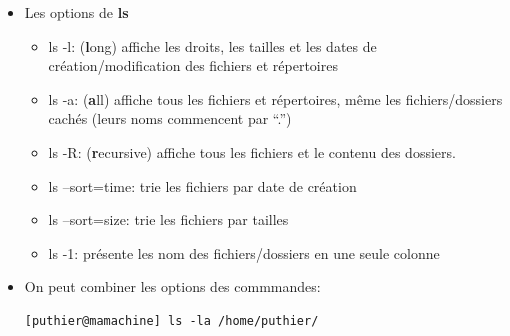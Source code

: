 \documentclass[10pt, xcolor=dvipsnames]{beamer}
\begin{document}
\begin{frame}[fragile]

        \begin{itemize}

            \item Les options de \textbf{ls}\\
			\begin{itemize}
             \item ls -l: (\textbf{l}ong) affiche les droits, les tailles et les dates de création/modification des fichiers et répertoires \\
             \item ls -a: (\textbf{a}ll) affiche tous les fichiers et répertoires, même les fichiers/dossiers cachés (leurs noms commencent par ``.'')  \\
             \item ls -R: (\textbf{r}ecursive) affiche tous les fichiers et le contenu des dossiers.\\

	         \item ls --sort=time: trie les fichiers par date de création\\
             \item ls --sort=size: trie les fichiers par tailles\\

             \item ls -1: présente les nom des fichiers/dossiers en une seule colonne\\
			\end{itemize}
            \item On peut combiner les options des commmandes:\\
            \begin{verbatim}[puthier@mamachine] ls -la /home/puthier/\end{verbatim}
        \end{itemize}

\end{frame}
\end{document}
